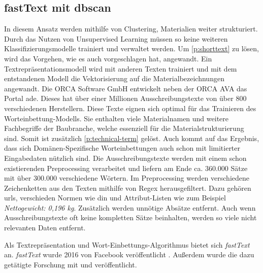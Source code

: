 \subsection{fastText mit \acf{dbscan}}
\label{c:conception:fine-structuring:dbscan}
In diesem Ansatz werden mithilfe von Clustering, Materialien weiter strukturiert. Durch das Nutzen von Unsupervised Learning müssen so keine weiteren Klassifizierungsmodelle trainiert und verwaltet werden.
Um \autoref{p:shorttext} zu lösen, wird das Vorgehen, wie es auch \cite{Qingyuan2019} vorgeschlagen hat, angewandt. Ein Textrepräsentationsmodell wird mit anderen Texten trainiert und mit dem entstandenen Modell die Vektorisierung auf die Materialbezeichnungen angewandt. 
Die \glqq ORCA Software GmbH\grqq{} entwickelt neben der ORCA AVA das Portal \ac{ade}. Dieses hat über einer Millionen Ausschreibungstexte von über 800 verschiedenen Herstellern. Diese Texte eignen sich optimal für das Trainieren des Worteinbettung-Modells. Sie enthalten viele Materialnamen und weitere Fachbegriffe der Baubranche, welche essenziell für die Materialstrukturierung sind. Somit ist zusätzlich \autoref{p:technical-term} gelöst. Auch \cite{nooralahzadeh2018evaluation} kommt auf das Ergebnis, dass sich Domänen-Spezifische Worteinbettungen auch schon mit limitierter Eingabedaten nützlich sind.
Die Ausschreibungstexte werden mit einem schon existierenden Preprocessing verarbeitet und liefern am Ende ca. 360.000 Sätze mit über 300.000 verschiedene Wörtern. Im Preprocessing werden verschiedene Zeichenketten aus den Texten mithilfe von Regex herausgefiltert. Dazu gehören \ac{url}s, verschieden Normen wie \ac{din} und Attribut-Listen wie zum Beispiel \textit{Nettogewicht: 0,196 kg}. Zusätzlich werden unnötige Absätze entfernt.
Auch wenn Ausschreibungstexte oft keine kompletten Sätze beinhalten, werden so viele nicht relevanten Daten entfernt.

Als Textrepräsentation und Wort-Einbettungs-Algorithmus bietet sich \textit{fastText} an. \textit{fastText} wurde 2016 von Facebook veröffentlicht \citep[vgl.][]{fastText_release2016}. Außerdem wurde die dazu getätigte Forschung mit \cite{bojanowski2017enriching} und \cite{joulin2016bag} veröffentlicht.

